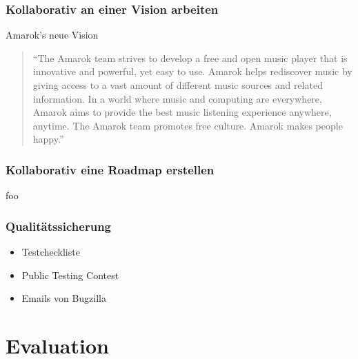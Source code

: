 \documentclass{beamer}
\begin{document}
\begin{frame}
\frametitle{Kollaborativ an einer Vision arbeiten}
\begin{block}{Amarok's neue Vision}
\begin{quotation}``The Amarok team strives to develop a free and open music player that is innovative and powerful, yet easy to use. Amarok helps rediscover music by giving access to a vast amount of different music sources and related information. In a world where music and computing are everywhere, Amarok aims to provide the best music listening experience anywhere, anytime. The Amarok team promotes free culture. Amarok makes people happy.''\end{quotation}
\end{block}
\end{frame}

\begin{frame}
\frametitle{Kollaborativ eine Roadmap erstellen}
foo
\end{frame}

\begin{frame}
\frametitle{Qualit\"atssicherung}
\begin{itemize}
 \item Testcheckliste
 \item Public Testing Contest
 \item Emails von Bugzilla
\end{itemize}
\end{frame}

\section{Evaluation}
\end{document}
